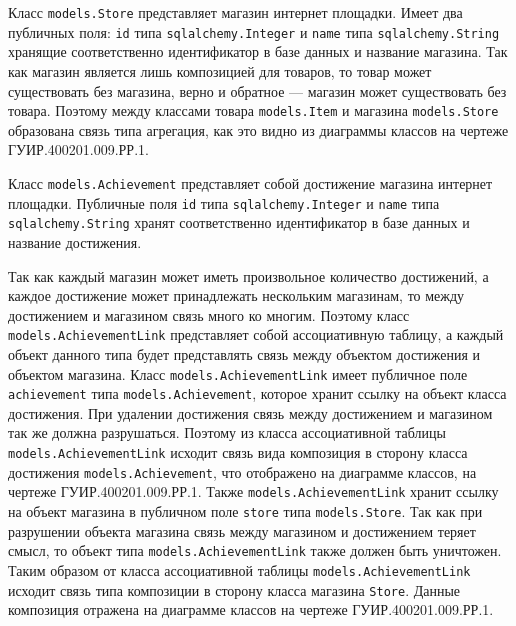 Класс \texttt{mo\-dels.Store} представляет магазин интернет площадки. Имеет два публичных поля: \texttt{id} типа \texttt{sqlalchemy.Integer} и \texttt{name} типа \texttt{sql\-alchemy.String} хранящие соответственно идентификатор в базе данных и название магазина. Так как магазин является лишь композицией для товаров, то товар может существовать без магазина, верно и обратное --- магазин может существовать без товара. Поэтому между классами товара \texttt{mo\-dels.Item} и магазина \texttt{mo\-dels.Store} образована связь типа агрегация, как это видно из диаграммы классов на чертеже ГУИР.400201.009.РР.1.

Класс \texttt{mo\-dels.Achievement} представляет собой достижение магазина интернет площадки. Публичные поля \texttt{id} типа \texttt{sqlalchemy.Integer} и \texttt{name} типа \texttt{sqlalchemy.String} хранят соответственно идентификатор в базе данных и название достижения.

Так как каждый магазин может иметь произвольное количество достижений, а каждое достижение может принадлежать нескольким магазинам, то между достижением и магазином связь много ко многим. Поэтому класс \texttt{mo\-dels.AchievementLink} представляет собой ассоциативную таблицу, а каждый объект данного типа будет представлять связь между объектом достижения и объектом магазина. Класс \texttt{mo\-dels.AchievementLink} имеет публичное поле \texttt{achievement} типа \texttt{mo\-dels.Achievement}, которое хранит ссылку на объект класса достижения. При удалении достижения связь между достижением и магазином так же должна разрушаться. Поэтому из класса ассоциативной таблицы \texttt{mo\-dels.AchievementLink} исходит связь вида композиция в сторону класса достижения \texttt{mo\-dels.Achievement}, что отображено на диаграмме классов, на чертеже ГУИР.400201.009.РР.1. Также \texttt{mo\-dels.AchievementLink} хранит ссылку на объект магазина в публичном поле \texttt{store} типа \texttt{mo\-dels.Store}. Так как при разрушении объекта магазина связь между магазином и достижением теряет смысл, то объект типа \texttt{mo\-dels.AchievementLink} также должен быть уничтожен. Таким образом от класса ассоциативной таблицы \texttt{mo\-dels.AchievementLink} исходит связь типа композиции в сторону класса магазина \texttt{Store}. Данные композиция отражена на диаграмме классов на чертеже ГУИР.400201.009.РР.1.

